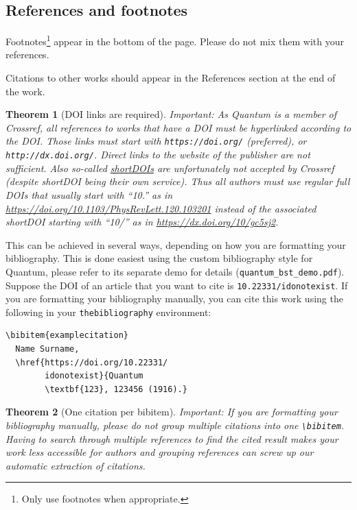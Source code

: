 \documentclass[a4paper,twocolumn,11pt,accepted=2017-05-09]{quantumarticle}
\newtheorem{theorem}{Theorem}
\begin{document}
\subsection{References and footnotes}
\label{sec:subsec1}
Footnotes\footnote{Only use footnotes when appropriate.} appear in the bottom of the page.
Please do not mix them with your references.

Citations to other works should appear in the References section at the end of the work.

\begin{theorem}[DOI links are required]
  Important: As Quantum is a member of Crossref, all references to works that have a DOI must be hyperlinked according to the DOI. Those links must start with \texttt{https://doi.org/} (preferred), or \texttt{http://dx.doi.org/}. Direct links to the website of the publisher are not sufficient. Also so-called \href{https://shortdoi.org/}{shortDOIs} are unfortunately not accepted by Crossref (despite shortDOI being their own service). Thus all authors must use regular full DOIs that usually start with \mbox{``10.''} as in \url{https://doi.org/10.1103/PhysRevLett.120.103201} instead of the associated shortDOI starting with \mbox{``10/''} as in \url{https://dx.doi.org/10/gc5sj2}.
\end{theorem}

This can be achieved in several ways, depending on how you are formatting your bibliography.
This is done easiest using the custom bibliography style for Quantum,
please refer to its separate demo for details (\texttt{quantum\_bst\_demo.pdf}).
Suppose the DOI of an article \cite{examplecitation} that you want to cite is \texttt{10.22331/idonotexist}.
If you are formatting your bibliography manually, you can cite this work using the following in your \texttt{thebibliography} environment:
\begin{verbatim}
\bibitem{examplecitation}
  Name Surname,
  \href{https://doi.org/10.22331/
        idonotexist}{Quantum
        \textbf{123}, 123456 (1916).}
\end{verbatim}

\begin{theorem}[One citation per bibitem]
  Important: If you are formatting your bibliography manually, please do not group multiple citations into one \texttt{\textbackslash{}bibitem}.
  Having to search through multiple references to find the cited result makes your work less accessible for authors and grouping references can screw up our automatic extraction of citations.
\end{theorem}
\end{document}
